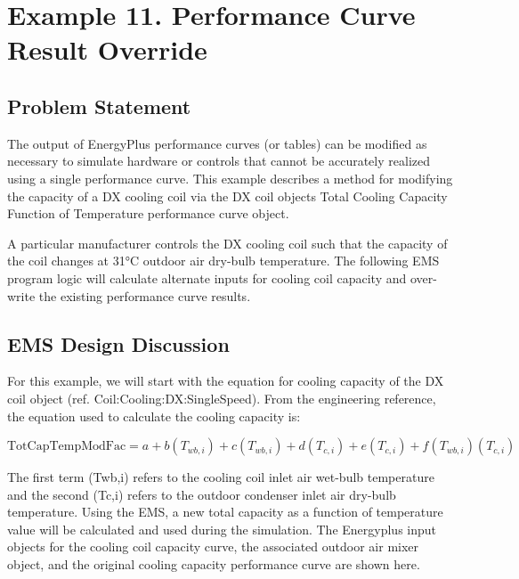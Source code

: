 \section{Example 11. Performance Curve Result Override}\label{example-11.-performance-curve-result-override}

\subsection{Problem Statement}\label{problem-statement-001}

The output of EnergyPlus performance curves (or tables) can be modified as necessary to simulate hardware or controls that cannot be accurately realized using a single performance curve. This example describes a method for modifying the capacity of a DX cooling coil via the DX coil objects Total Cooling Capacity Function of Temperature performance curve object.

A particular manufacturer controls the DX cooling coil such that the capacity of the coil changes at 31°C outdoor air dry-bulb temperature. The following EMS program logic will calculate alternate inputs for cooling coil capacity and over-write the existing performance curve results.

\subsection{EMS Design Discussion}\label{ems-design-discussion-001}

For this example, we will start with the equation for cooling capacity of the DX coil object (ref. Coil:Cooling:DX:SingleSpeed). From the engineering reference, the equation used to calculate the cooling capacity is:

\begin{equation}
\text{TotCapTempModFac} = a + b \left( T_{wb,i} \right) + c \left( T_{wb,i} \right) + d \left( T_{c,i} \right) + e \left( T_{c,i} \right) + f \left( T_{wb,i} \right)\left( T_{c,i} \right)
\end{equation}

The first term (Twb,i) refers to the cooling coil inlet air wet-bulb temperature and the second (Tc,i) refers to the outdoor condenser inlet air dry-bulb temperature. Using the EMS, a new total capacity as a function of temperature value will be calculated and used during the simulation. The Energyplus input objects for the cooling coil capacity curve, the associated outdoor air mixer object, and the original cooling capacity performance curve are shown here.

